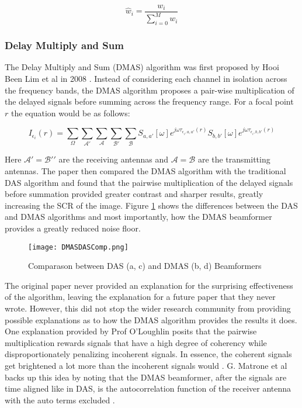 \begingroup
\large
\begin{equation}
    \hat{w}_i = \frac{w_i}{\sum_{i=0}^{M} w_i}
\end{equation} 
\endgroup

\subsubsection{Delay Multiply and Sum}
The Delay Multiply and Sum (DMAS) algorithm was first proposed by Hooi Been Lim et al in 2008
\cite{beenlimConfocalMicrowaveImaging2008}. Instead of considering each channel in isolation across the frequency bands,
the DMAS algorithm proposes a pair-wise multiplication of the delayed signals before summing across the frequency range.
For a focal point $r$ the equation would be as follows:


\begingroup
\large
\begin{equation}
    I_{\epsilon_i}(r) = \sum_{\Omega}\sum_{\mathcal{A}'}\sum_{\mathcal{A}}\sum_{\mathcal{B}'}\sum_{\mathcal{B}} S_{a, a'}[\omega]e^{j\omega \tau_{\epsilon_i, a, a'}(r)} S_{b, b'}[\omega]e^{j\omega \tau_{\epsilon_i, b, b'}(r)}
    \label{eq:DMASBeamformer}
\end{equation}
\endgroup

Here $\mathcal{A}' = \mathcal{B'}'$ are the receiving antennas and $\mathcal{A} = \mathcal{B}$ are the transmitting
antennas. The paper then compared the DMAS algorithm with the traditional DAS algorithm and found that the pairwise
multiplication of the delayed signals before summation provided greater contrast and sharper results, greatly increasing
the SCR of the image. Figure \ref{fig:DMASDASComp} shows the differences between the DAS and DMAS algorithms and most
importantly, how the DMAS beamformer provides a greatly reduced noise floor.

\begin{figure}[!h]
    \texttt{[image: DMASDASComp.png]}
    \centering
    \caption{Comparason between DAS (a, c) and DMAS (b, d) Beamformers}
    \label{fig:DMASDASComp}
\end{figure}

The original paper never provided an explanation for the surprising effectiveness of the algorithm, leaving
the explanation for a future paper that they never wrote. However, this did not stop the wider research community from
providing possible explanations as to how the DMAS algorithm provides the results it does. One explanation provided by
Prof O'Loughlin posits that the pairwise multiplication rewards signals that have a high degree of coherency while
disproportionately penalizing incoherent signals. In essence, the coherent signals get brightened a lot more than the
incoherent signals would \cite{oloughlinComparingRadarBasedBreast2019}. G. Matrone et al backs up this idea by
noting that the DMAS beamformer, after the signals are time aligned like in DAS, is the autocorrelation function of the
receiver antenna with the auto terms excluded \cite{g.matroneDelayMultiplySum2015}.